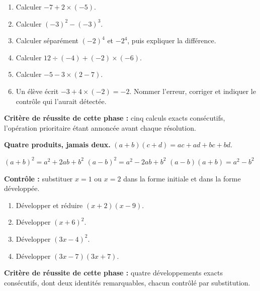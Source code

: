 \documentclass[10pt,a4paper]{article}
\begin{document}
\begin{enumerate}
\needspace{18mm}
\item Calculer $-7 + 2 \times (-5)$.
\needspace{18mm}
\item Calculer $(-3)^2 - (-3)^3$.
\needspace{18mm}
\item Calculer séparément $(-2)^4$ et $-2^4$, puis expliquer la différence.
\needspace{18mm}
\item Calculer $12 \div (-4) + (-2)\times(-6)$.
\needspace{18mm}
\item Calculer $-5 - 3 \times (2 - 7)$.
\needspace{18mm}
\item Un élève écrit $-3 + 4 \times (-2) = -2$. Nommer l'erreur, corriger et indiquer le contrôle qui l'aurait détectée.
\end{enumerate}
\begin{successbox}\textbf{Critère de réussite de cette phase :} cinq calculs exacts consécutifs, l'opération prioritaire étant annoncée avant chaque résolution.\end{successbox}
\certline
\needspace{62mm}\par\vspace{3mm}
\begin{methodbox}
\textbf{Quatre produits, jamais deux.} $(a+b)(c+d) = ac + ad + bc + bd$.
\par\smallskip
$(a+b)^2 = a^2 + 2ab + b^2$ \qquad $(a-b)^2 = a^2 - 2ab + b^2$ \qquad $(a-b)(a+b) = a^2 - b^2$
\par\smallskip
\textbf{Contrôle :} substituer $x = 1$ ou $x = 2$ dans la forme initiale et dans la forme développée.
\end{methodbox}
\begin{enumerate}
\needspace{18mm}
\item Développer et réduire $(x + 2)(x - 9)$.
\needspace{18mm}
\item Développer $(x + 6)^2$.
\needspace{18mm}
\item Développer $(3x - 4)^2$.
\needspace{18mm}
\item Développer $(3x - 7)(3x + 7)$.
\end{enumerate}
\begin{successbox}\textbf{Critère de réussite de cette phase :} quatre développements exacts consécutifs, dont deux identités remarquables, chacun contrôlé par substitution.\end{successbox}
\certline
\needspace{62mm}\par\vspace{3mm}
\end{document}

